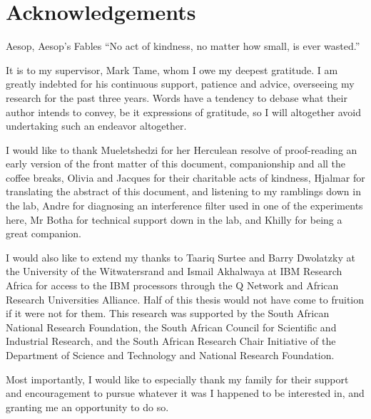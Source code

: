 \chapter*{Acknowledgements}

\begin{epigram}{Aesop, Aesop's Fables}
	\enquote{No act of kindness, no matter how small, is ever wasted.}
\end{epigram}

\noindent
It is to my supervisor, Mark Tame, whom I owe my deepest gratitude. I am greatly indebted for his continuous support, patience and advice, overseeing my research for the past three years. Words have a tendency to debase what their author intends to convey, be it expressions of gratitude, so I will altogether avoid undertaking such an endeavor altogether.

\bigskip
\noindent
I would like to thank Mueletshedzi for her Herculean resolve of proof-reading an early version of the front matter of this document, companionship and all the coffee breaks, Olivia and Jacques for their charitable acts of kindness, Hjalmar for translating the abstract of this document, and listening to my ramblings down in the lab, Andre for diagnosing an interference filter used in one of the experiments here, Mr Botha for technical support down in the lab, and Khilly for being a great companion.

\bigskip
\noindent
I would also like to extend my thanks to Taariq Surtee and Barry Dwolatzky at the University of the Witwatersrand and Ismail Akhalwaya at IBM Research Africa for access to the IBM processors through the Q Network and African Research Universities Alliance. Half of this thesis would not have come to fruition if it were not for them. This research was supported by the South African National Research Foundation, the South African Council for Scientific and Industrial Research, and the South African Research Chair Initiative of the Department of Science and Technology and National Research Foundation.

\bigskip
\noindent
Most importantly, I would like to especially thank my family for their support and encouragement to pursue whatever it was I happened to be interested in, and granting me an opportunity to do so.
